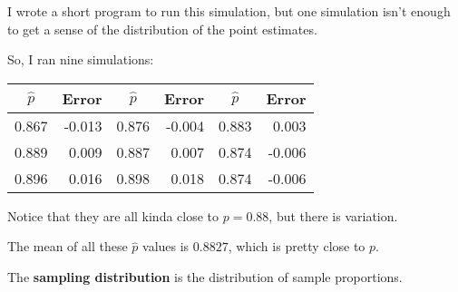\documentclass{beamer}
\begin{document}
\begin{frame}
  \begin{example}
    I wrote a short program to run this simulation, but one simulation isn't enough to get a sense of the distribution of the point estimates.\pause

    \vspace{1mm}
    So, I ran nine simulations:
    \begin{center}
      \begin{tabular}{cr|cr|cr}
        $\hat{p}$ & Error & $\hat{p}$ & Error & $\hat{p}$ & Error \\\hline
        0.867 & -0.013 & 0.876 & -0.004 & 0.883 & 0.003 \\
        0.889 & 0.009 & 0.887 & 0.007 & 0.874 & -0.006 \\
        0.896 & 0.016 & 0.898 & 0.018 & 0.874 & -0.006 \\
      \end{tabular}
    \end{center}

    Notice that they are all kinda close to $p=0.88$, but there is variation.\pause

    \vspace{1mm}
    The mean of all these $\hat{p}$ values is $0.8827$, which is pretty close to $p$.
  \end{example}\pause

  \begin{definition}
    The \textbf{sampling distribution} is the distribution of sample proportions.
  \end{definition}
\end{frame}
\end{document}
